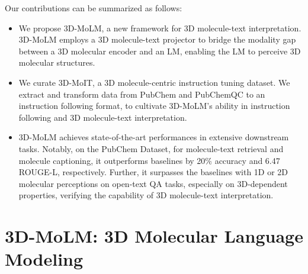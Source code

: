 Our contributions can be summarized as follows:
\begin{itemize}[leftmargin=*]
\item We propose 3D-MoLM, a new framework for 3D molecule-text interpretation. 3D-MoLM employs a 3D molecule-text projector to bridge the modality gap between a 3D molecular encoder and an LM, enabling the LM to perceive 3D molecular structures.

\item We curate 3D-MoIT, a 3D molecule-centric instruction tuning dataset. We extract and transform data from PubChem and PubChemQC to an instruction following format, to cultivate 3D-MoLM's ability in instruction following and 3D molecule-text interpretation.

\item 3D-MoLM achieves state-of-the-art performances in extensive downstream tasks. Notably, on the PubChem Dataset, for molecule-text retrieval and molecule captioning, it outperforms baselines by 20\% accuracy and 6.47 ROUGE-L, respectively. Further, it surpasses the baselines with 1D or 2D molecular perceptions on open-text QA tasks, especially on 3D-dependent properties, verifying the capability of 3D molecule-text interpretation.
\end{itemize}%
\vspace{-3mm}
\section{3D-MoLM: 3D Molecular Language Modeling}
\vspace{-2mm}

